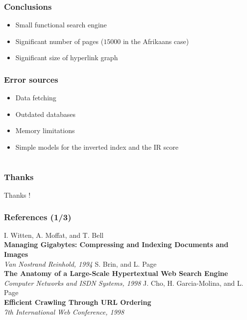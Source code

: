 \documentclass[10pt]{beamer}
\begin{document}
\begin{frame}
  \frametitle{Conclusions}
  \begin{itemize}
    \item Small functional search engine
    \item Significant number of pages ($15000$ in the Afrikaans case)
    \item Significant size of hyperlink graph
  \end{itemize}
\end{frame}

\begin{frame}
  \frametitle{Error sources}
  \begin{itemize}
    \item Data fetching
    \item Outdated databases
    \item Memory limitations
    \item Simple models for the inverted index and the IR score
  \end{itemize}
\end{frame}



\section{}

\begin{frame}
  \frametitle{Thanks}
  \begin{center}
    \huge{Thanks !}
  \end{center}
\end{frame}

\begin{frame}
  \frametitle{References (1/3)}
  \begin{thebibliography}{1}
      I. Witten, A. Moffat, and T. Bell\\
      \textbf{Managing Gigabytes: Compressing and Indexing Documents and Images}\\
      \emph{Van Nostrand Reinhold, 1994}
      S. Brin, and L. Page\\
      \textbf{The Anatomy of a Large-Scale Hypertextual Web Search Engine}\\
      \emph{Computer Networks and ISDN Systems, 1998}
      J. Cho, H. Garcia-Molina, and L. Page\\
      \textbf{Efficient Crawling Through URL Ordering}\\
      \emph{7th International Web Conference, 1998}
  \end{thebibliography}
\end{frame}
\end{document}
